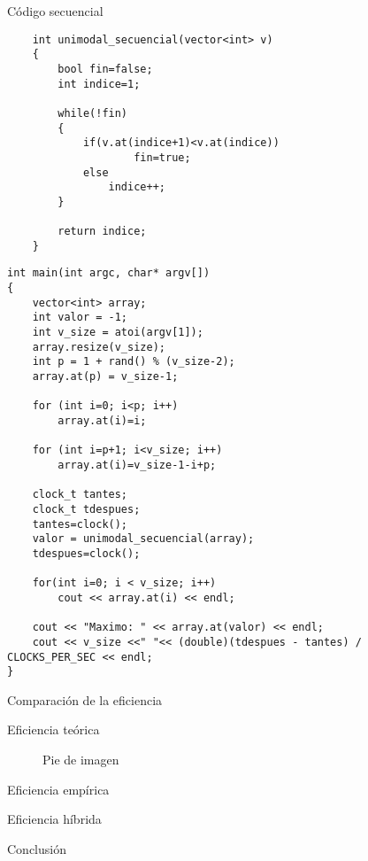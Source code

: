 \documentclass[12pt]{beamer}
\begin{document}
\begin{frame}[fragile]{Código secuencial}
	\begin{lstlisting}
	int unimodal_secuencial(vector<int> v)
	{
  		bool fin=false;
  		int indice=1;
  		
  		while(!fin)
  		{
   	 		if(v.at(indice+1)<v.at(indice))
        			fin=true;
     		else
        		indice++;
  		}
  		
 	 	return indice;
	}
	\end{lstlisting}
\end{frame}

\begin{frame}[fragile]
	\begin{lstlisting}
int main(int argc, char* argv[])
{
  	vector<int> array;
  	int valor = -1;
  	int v_size = atoi(argv[1]);
  	array.resize(v_size);
	int p = 1 + rand() % (v_size-2);
	array.at(p) = v_size-1;
    
    for (int i=0; i<p; i++) 
        array.at(i)=i;
        
    for (int i=p+1; i<v_size; i++) 
        array.at(i)=v_size-1-i+p;

  	clock_t tantes;
  	clock_t tdespues;
  	tantes=clock();
  	valor = unimodal_secuencial(array);
 	tdespues=clock();
 	
  	for(int i=0; i < v_size; i++)
		cout << array.at(i) << endl;
     	
    cout << "Maximo: " << array.at(valor) << endl;
	cout << v_size <<" "<< (double)(tdespues - tantes) / CLOCKS_PER_SEC << endl;
}
	\end{lstlisting}

\end{frame}

\begin{frame}{Comparación de la eficiencia}

\begin{block}{Eficiencia teórica}
\begin{figure}[H] 
\centering
\caption{Pie de imagen} 
\label{etiqueta} 
\end{figure}
\end{block}

\begin{block}{Eficiencia empírica}

\end{block}

\begin{block}{Eficiencia híbrida}

\end{block}

\end{frame}

\begin{frame}{Conclusión}

\end{frame}
\end{document}
